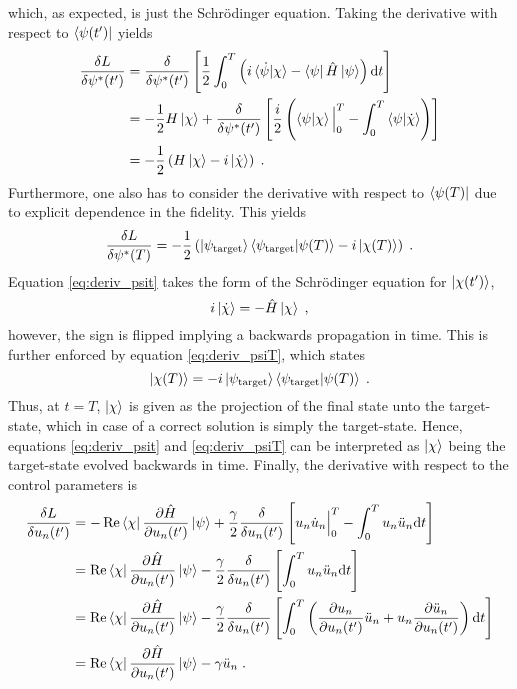 which, as expected, is just the Schrödinger equation.
Taking the derivative with respect to $\bra{\psi (t')}$ yields
\begin{align}
	\frac{\delta L}{\delta \psi ^* (t')} &= \frac{\delta }{\delta \psi ^* (t')} \left[ \frac{1}{2} \int_{0}^{T} \left( i \braket{\dot{\psi} | \chi} -  \bra{\psi} \hat{H} \ket{\psi} \right) \mathrm{d}t \right] \nonumber \\ 
	&= - \frac{1}{2} H \ket{\chi} + \frac{\delta }{\delta \psi ^* (t')} \left[ \frac{i}{2} \left( \braket{\psi | \chi} \Big|_0^T - \int_0^T \braket{\psi | \dot{\chi}} \right) \right] \nonumber \\
	&= - \frac{1}{2} \left( H \ket{\chi} -i \ket{\dot{\chi}}  \right) \; . \label{eq:deriv_psit}
\end{align}
Furthermore, one also has to consider the derivative with respect to $\bra{\psi (T)}$ due to explicit dependence in the fidelity. This yields
\begin{equation}
	\frac{\delta L}{\delta \psi ^* (T)} = - \frac{1}{2} \left( \ket{\psi_{\mathrm{target}}} \braket{\psi_{\mathrm{target}} | \psi (T)} - i \ket{\chi (T)} \right) \; . \label{eq:deriv_psiT}
\end{equation}
Equation \ref{eq:deriv_psit} takes the form of the Schrödinger equation for $\ket{\chi (t')}$,
\begin{equation}
	 i \ket{\dot{\chi}} =  - \hat{H} \ket{\chi} \; ,
\end{equation}
however, the sign is flipped implying a backwards propagation in time. This is further enforced by equation \ref{eq:deriv_psiT}, which states
\begin{equation}
	 \ket{\chi (T)} = -i \ket{\psi_{\mathrm{target}}} \braket{\psi_{\mathrm{target}} | \psi (T)} \; .
\end{equation}
Thus, at $t = T$, $\ket{\chi}$ is given as the projection of the final state unto the target-state, which in case of a correct solution is simply the target-state. Hence, equations \ref{eq:deriv_psit} and \ref{eq:deriv_psiT} can be interpreted as $\ket{\chi}$ being the target-state evolved backwards in time.
Finally, the derivative with respect to the control parameters is 
\begin{align}
	\frac{\delta L}{\delta u_n (t')} &= - \Re \bra{\chi} \pdv{\hat{H}}{u_n (t')} \ket{\psi} + \frac{\gamma}{2} \frac{\delta }{\delta u_n (t')} \left[ u_n \dot{u}_n \Big|_0^T - \int_0^T u_n \ddot{u}_n \mathrm{d}t \right] \nonumber \\
	&=  \Re \bra{\chi} \pdv{\hat{H}}{u_n (t')} \ket{\psi} - \frac{\gamma}{2} \frac{\delta }{\delta u_n (t')} \left[ \int_0^T u_n \ddot{u}_n \mathrm{d}t \right] \nonumber \\
	&=  \Re \bra{\chi} \pdv{\hat{H}}{u_n (t')} \ket{\psi} - \frac{\gamma}{2} \frac{\delta }{\delta u_n (t')} \left[ \int_0^T \left( \pdv{u_n}{u_n (t')} \ddot{u}_n + u_n \pdv{\ddot{u}_n}{u_n (t')} \right) \mathrm{d}t \right] \nonumber \\
	&= \Re \bra{\chi} \pdv{\hat{H}}{u_n (t')} \ket{\psi} - \gamma \ddot{u}_n \; . \label{eq:deriv_u} 
\end{align} 
